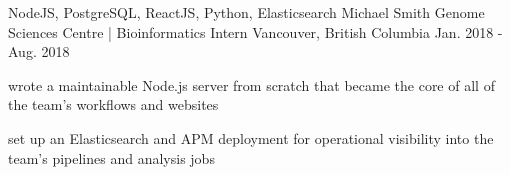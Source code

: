 \begin{cventries}
  \cventry
    {NodeJS, PostgreSQL, ReactJS, Python, Elasticsearch} %
    {Michael Smith Genome Sciences Centre | Bioinformatics Intern} %
    {Vancouver, British Columbia} %
    {Jan. 2018 - Aug. 2018} %
    {
      \begin{cvitems} %
        \item {wrote a maintainable Node.js server from scratch that became the core of all of the team’s workflows and websites}
        \item {set up an Elasticsearch and APM deployment for operational visibility into the team’s pipelines and analysis jobs}
      \end{cvitems}
    }

\end{cventries}
